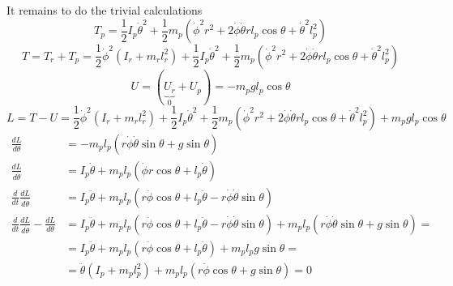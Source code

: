 \documentclass[unicode]{article}
\begin{document}
It remains to do the trivial calculations
\[
    T_p = \frac{1}{2}I_p\dot{\theta}^2 + \frac{1}{2}m_p\left(\dot{\phi}^2 r^2 + 2 \dot{\phi} \dot{\theta} r l_p \cos \theta + \dot{\theta}^2 l_p^2\right)
\]
\[
    T = T_r + T_p = \frac{1}{2}\dot{\phi}^2(I_r + m_rl_r^2) + \frac{1}{2}I_p\dot{\theta}^2 + \frac{1}{2}m_p\left(\dot{\phi}^2 r^2 + 2 \dot{\phi} \dot{\theta} r l_p \cos \theta + \dot{\theta}^2 l_p^2\right)
\]
\[
    U = \left( \underbrace{U_r}_{0} + U_p \right) = - m_p g l_p \cos \theta
\]
\[
    L = T - U = \frac{1}{2}\dot{\phi}^2(I_r + m_rl_r^2) + \frac{1}{2} I_p \dot{\theta}^2 + \frac{1}{2} m_p \left(\dot{\phi}^2 r^2 + 2 \dot{\phi} \dot{\theta} r l_p \cos \theta + \dot{\theta}^2 l_p^2\right) + m_p g l_p \cos \theta
\]
\begin{align*}
    \frac{dL}{d\theta}                                         & = - m_p l_p (r \dot{\phi} \dot{\theta} \sin \theta + g \sin \theta)                                                   \\
    \frac{dL}{d\dot{\theta}}                                   & = I_p \dot{\theta} + m_p l_p (\dot{\phi} r \cos \theta + l_p \dot{\theta})                                            \\
    \frac{d}{dt} \frac{dL}{d\dot{\theta}}                      & = I_p \ddot{\theta} + m_p l_p (r \ddot{\phi} \cos \theta + l_p \ddot{\theta} - r \dot{\phi} \dot{\theta} \sin \theta) \\
    \frac{d}{dt} \frac{dL}{d\dot{\theta}} - \frac{dL}{d\theta} & =
    I_p \ddot{\theta} + m_p l_p (r \ddot{\phi} \cos \theta + l_p \ddot{\theta} - r \dot{\phi} \dot{\theta} \sin \theta) + m_p l_p (r \dot{\phi} \dot{\theta} \sin \theta + g \sin \theta) = \\
                                                               & = I_p \ddot{\theta} + m_p l_p (r \ddot{\phi} \cos \theta + l_p \ddot{\theta}) + m_p l_p g \sin \theta =               \\
                                                               & = \ddot{\theta} (I_p  + m_p l_p^2) + m_p l_p (r \ddot{\phi} \cos \theta + g \sin \theta) = 0
\end{align*}
\end{document}

